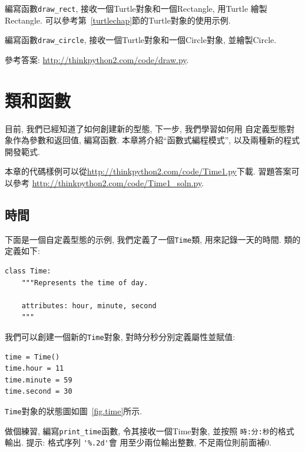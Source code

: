\documentclass[10pt]{book}
\begin{document}
\begin{exercise}

編寫函數\verb"draw_rect", 接收一個Turtle對象和一個Rectangle, 
用Turtle 繪製Rectangle. 
可以參考第~\ref{turtlechap}節的Turtle對象的使用示例. 

編寫函數\verb"draw_circle",  接收一個Turtle對象和一個Circle對象, 並繪製Circle.


參考答案: \url{http://thinkpython2.com/code/draw.py}.

\end{exercise}



\chapter{類和函數}
\label{time}

目前, 我們已經知道了如何創建新的型態, 下一步, 我們學習如何用
自定義型態對象作為參數和返回值, 編寫函數. 
本章將介紹``函數式編程模式'', 以及兩種新的程式開發範式. 


本章的代碼樣例可以從\url{http://thinkpython2.com/code/Time1.py}下載. 
習題答案可以參考
\url{http://thinkpython2.com/code/Time1_soln.py}.


\section{時間}
\label{isafter}

下面是一個自定義型態的示例, 我們定義了一個{\tt Time}類, 
用來記錄一天的時間. 
類的定義如下: 
 

\begin{verbatim}
class Time:
    """Represents the time of day.
       
    attributes: hour, minute, second
    """
\end{verbatim}
%
我們可以創建一個新的{\tt Time}對象, 
對時分秒分別定義屬性並賦值:

\begin{verbatim}
time = Time()
time.hour = 11
time.minute = 59
time.second = 30
\end{verbatim}
%
{\tt Time}對象的狀態圖如圖~\ref{fig.time}所示.

做個練習, 編寫\verb"print_time"函數, 令其接收一個Time對象, 並按照
{\tt 時:分:秒}的格式輸出. 
提示: 格式序列 \verb"'%.2d'"會
用至少兩位輸出整數, 不足兩位則前面補0. 
\end{document}

